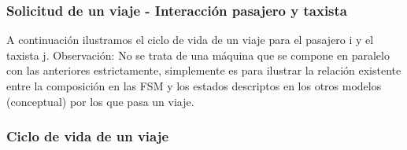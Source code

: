 \subsubsection{Solicitud de un viaje - Interacci\'on pasajero y taxista}

\newpage

A continuación ilustramos el ciclo de vida de un viaje para el pasajero i y el taxista j. Observación: No se trata de una máquina que se compone en paralelo con las anteriores estrictamente, simplemente es para ilustrar la relación existente entre la composición en las FSM y los estados descriptos en los otros modelos (conceptual) por los que pasa un  viaje.


\subsubsection{Ciclo de vida de un viaje}
\label{fsm:ciclovidaviaje}

